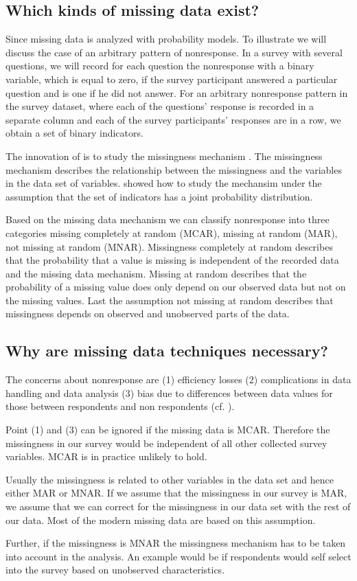 \subsection{Which kinds of missing data exist?} 
Since \cite{rubin1976} missing data is analyzed with probability models. 
To illustrate we will discuss the case of an arbitrary pattern of nonresponse.
In a survey with several questions, we will record for each question the nonresponse with a binary variable, which is equal to zero, if the survey participant answered a particular question and is one if he did not answer. 
For an arbitrary nonresponse pattern in the survey dataset, where each of the questions' response is recorded in a separate column and each of the survey participants' responses are in a row, we obtain a set of binary indicators. \par 
The innovation of \cite{rubin1976} is to study the missingness mechanism \cite{Little}. The missingness mechanism describes the relationship between the missingness and the variables in the data set of variables. \cite{rubin1976} showed how to study the mechansim under the assumption that the set of indicators has a joint probability distribution. \par
Based on the missing data mechanism we can classify nonresponse into three categories missing completely at random (MCAR), missing at random (MAR), not missing at random (MNAR). Missingness completely at random describes that the probability that a value is missing is independent of the recorded data and the missing data mechanism. 
Missing at random describes that the probability of a missing value does only depend on our observed data but not on the missing values. 
Last the assumption not missing at random describes that missingness depends on observed and unobserved parts of the data. \par

\subsection{Why are missing data techniques necessary?}

The concerns about nonresponse are (1) efficiency losses (2) complications in data handling and data analysis (3) bias due to differences between data values for those between respondents and non respondents  (cf. \cite{Schafer99}). \par 
Point (1) and (3)  can be ignored if the missing data is MCAR. 
Therefore the missingness in our survey would be independent of all other collected survey variables. MCAR is in practice unlikely to hold. \par 
Usually the missingness is related to other variables in the data set and hence either MAR or MNAR. 
If we assume that the missingness in our survey is  MAR, we assume that we can correct for the missingness in our data set with the rest of our data. Most of the modern missing data are based on this assumption. \par
Further, if the missingness is MNAR the missingness mechanism has to be taken into account in the analysis. An example would be if respondents would self select into the survey based on unobserved characteristics.

